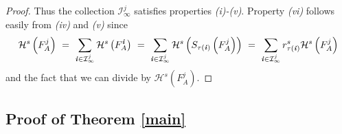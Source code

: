 \documentclass[11pt,english,british]{article}
\numberwithin{equation}{section}
\begin{document}
\begin{proof}
%
Thus the collection $\mathcal{I}_{\infty}^{j}$ satisfies properties
\textit{(i)-(v)}. Property \textit{(vi)} follows easily from \textit{(iv)}
and \textit{(v)} since
\[
\mathcal{H}^{s}\left(F_{A}^{j}\right) \ = \ \sum_{\textbf{\emph{i}}\in\mathcal{I}_{\infty}^{j}}\mathcal{H}^{s}\left(F_{A}^{\textbf{\emph{i}}}\right) \ = \ \sum_{\textbf{\emph{i}}\in\mathcal{I}_{\infty}^{j}}\mathcal{H}^{s}\left(S_{\tau(\textbf{\emph{i}})}\left(F_{A}^{j}\right)\right) \ = \ \sum_{\textbf{\emph{i}}\in\mathcal{I}_{\infty}^{j}}r_{\tau(\textbf{\emph{i}})}^{s}\mathcal{H}^{s}\left(F_{A}^{j}\right)
\]
and the fact that we can divide by $\mathcal{H}^{s}\left(F_{A}^{j}\right)$.
\end{proof}




\subsection{Proof of Theorem \ref{main}} \label{mainproof}
\end{document}
